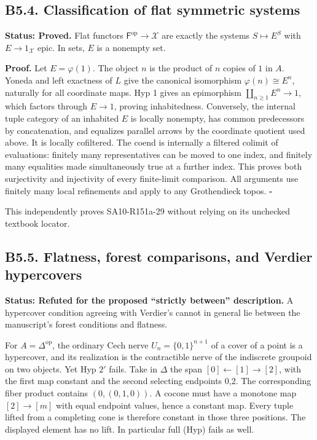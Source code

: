 \subsection{B5.4. Classification of flat symmetric
systems}\label{b5.4.-classification-of-flat-symmetric-systems}

\textbf{Status: Proved.} Flat functors
\(\mathsf F^{\mathrm{op}}\to\mathcal X\) are exactly the systems
\(S\mapsto E^S\) with \(E\to1_{\mathcal X}\) epic. In sets, \(E\) is a
nonempty set.

\textbf{Proof.} Let \(E=\varphi(1)\). The object \(n\) is the product of
\(n\) copies of \(1\) in \(A\). Yoneda and left exactness of \(L\) give
the canonical isomorphism \(\varphi(n)\cong E^n\), naturally for all
coordinate maps. Hyp 1 gives an epimorphism \(\coprod_{n\ge1}E^n\to1\),
which factors through \(E\to1\), proving inhabitedness. Conversely, the
internal tuple category of an inhabited \(E\) is locally nonempty, has
common predecessors by concatenation, and equalizes parallel arrows by
the coordinate quotient used above. It is locally cofiltered. The coend
is internally a filtered colimit of evaluations: finitely many
representatives can be moved to one index, and finitely many equalities
made simultaneously true at a further index. This proves both
surjectivity and injectivity of every finite-limit comparison. All
arguments use finitely many local refinements and apply to any
Grothendieck topos. \(\square\)

This independently proves SA10-R151a-29 without relying on its unchecked
textbook locator.

\subsection{B5.5. Flatness, forest comparisons, and Verdier
hypercovers}\label{b5.5.-flatness-forest-comparisons-and-verdier-hypercovers}

\textbf{Status: Refuted for the proposed ``strictly between''
description.} A hypercover condition agreeing with Verdier's cannot in
general lie between the manuscript's forest conditions and flatness.

For \(A=\Delta^{\mathrm{op}}\), the ordinary Cech nerve
\(U_n=\{0,1\}^{n+1}\) of a cover of a point is a hypercover, and its
realization is the contractible nerve of the indiscrete groupoid on two
objects. Yet Hyp \(2'\) fails. Take in \(\Delta\) the span
\([0]\leftarrow[1]\to[2]\), with the first map constant and the second
selecting endpoints 0,2. The corresponding fiber product contains
\((0,(0,1,0))\). A cocone must have a monotone map \([2]\to[m]\) with
equal endpoint values, hence a constant map. Every tuple lifted from a
completing cone is therefore constant in those three positions. The
displayed element has no lift. In particular full (Hyp) fails as well.

